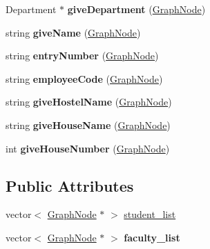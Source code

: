 \begin{DoxyCompactItemize}
\item 
\hypertarget{classNetwork_a31c6946733fcb571d9952b5c165abcc8}{\-Department $\ast$ {\bfseries give\-Department} (\hyperlink{structGraphNode}{\-Graph\-Node})}\label{classNetwork_a31c6946733fcb571d9952b5c165abcc8}

\item 
\hypertarget{classNetwork_a3acd7cd5049f7cc0230dda97c522e661}{string {\bfseries give\-Name} (\hyperlink{structGraphNode}{\-Graph\-Node})}\label{classNetwork_a3acd7cd5049f7cc0230dda97c522e661}

\item 
\hypertarget{classNetwork_aa943e2481ec6446a0fe187582cf46b95}{string {\bfseries entry\-Number} (\hyperlink{structGraphNode}{\-Graph\-Node})}\label{classNetwork_aa943e2481ec6446a0fe187582cf46b95}

\item 
\hypertarget{classNetwork_ae04bd23796ff43aa597be1ec25916ecf}{string {\bfseries employee\-Code} (\hyperlink{structGraphNode}{\-Graph\-Node})}\label{classNetwork_ae04bd23796ff43aa597be1ec25916ecf}

\item 
\hypertarget{classNetwork_af9e37d2248af4ed8fea0ee19646ad33b}{string {\bfseries give\-Hostel\-Name} (\hyperlink{structGraphNode}{\-Graph\-Node})}\label{classNetwork_af9e37d2248af4ed8fea0ee19646ad33b}

\item 
\hypertarget{classNetwork_a82bf90cb48f73d49d897052537b282d4}{string {\bfseries give\-House\-Name} (\hyperlink{structGraphNode}{\-Graph\-Node})}\label{classNetwork_a82bf90cb48f73d49d897052537b282d4}

\item 
\hypertarget{classNetwork_a2064f77060d8fca15e040b79a64dc038}{int {\bfseries give\-House\-Number} (\hyperlink{structGraphNode}{\-Graph\-Node})}\label{classNetwork_a2064f77060d8fca15e040b79a64dc038}

\end{DoxyCompactItemize}
\subsection*{\-Public \-Attributes}
\begin{DoxyCompactItemize}
\item 
vector$<$ \hyperlink{structGraphNode}{\-Graph\-Node} $\ast$ $>$ \hyperlink{classNetwork_a7bffe601dfdb5b2cd82d9a8c02dc258b}{student\-\_\-list}
\item 
\hypertarget{classNetwork_a341de1a02ee3721d1730e5fdc6a18292}{vector$<$ \hyperlink{structGraphNode}{\-Graph\-Node} $\ast$ $>$ {\bfseries faculty\-\_\-list}}\label{classNetwork_a341de1a02ee3721d1730e5fdc6a18292}

\end{DoxyCompactItemize}


